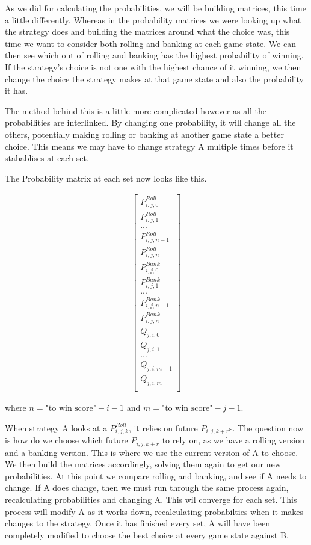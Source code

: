 \documentclass[a4paper,titlepage]{article}
\begin{document}
As we did for calculating the probabilities, we will be building matrices, this time a little differently. Whereas in the probability matrices we were looking up what the strategy does and building the matrices around what the choice was, this time we want to consider both rolling and banking at each game state. We can then see which out of rolling and banking has the highest probability of winning. If the strategy's choice is not one with the highest chance of it winning, we then change the choice the strategy makes at that game state and also the probability it has.

The method behind this is a little more complicated however as all the probabilities are interlinked. By changing one probability, it will change all the others, potentialy making rolling or banking at another game state a better choice. This means we may have to change strategy A multiple times before it stabablises at each set.

The Probability matrix at each set now looks like this.

\begin{align}
	\begin{bmatrix}
		P^{Roll}_{i,j,0}\\
		P^{Roll}_{i,j,1}\\
		...\\
		P^{Roll}_{i,j,n-1}\\
		P^{Roll}_{i,j,n}\\
		P^{Bank}_{i,j,0}\\
		P^{Bank}_{i,j,1}\\
		...\\
		P^{Bank}_{i,j,n-1}\\
		P^{Bank}_{i,j,n}\\
		Q_{j,i,0}\\
		Q_{j,i,1}\\
		...\\
		Q_{j,i,m-1}\\
		Q_{j,i,m}\\
	\end{bmatrix}
\end{align}

where $n=\text{"to win score"}-i-1$ and $m=\text{"to win score"}-j-1$.

When strategy A looks at a $P^{Roll}_{i,j,k}$, it relies on future $P_{i,j,k+r}$s. The question now is how do we choose which future $P_{i,j,k+r}$ to rely on, as we have a rolling version and a banking version. This is where we use the current version of A to choose. We then build the matrices accordingly, solving them again to get our new probabilities. At this point we compare rolling and banking, and see if A needs to change. If A does change, then we must run through the same process again, recalculating probabilities and changing A. This wil converge for each set. This process will modify A as it works down, recalculating probabilties when it makes changes to the strategy. Once it has finished every set, A will have been completely modified to choose the best choice at every game state against B.
\end{document}

